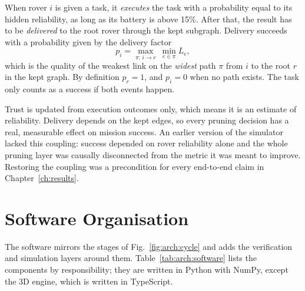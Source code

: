 \begin{definition}
When rover $i$ is given a task, it \emph{executes} the task with a
probability equal to its hidden reliability, as long as its battery is above
15\%. After that, the result has to be \emph{delivered} to the root rover
through the kept subgraph. Delivery succeeds with a probability given by the
delivery factor
\[
p_i=\max_{\pi:\,i\to r}\ \min_{e\in\pi} L_e,
\]
which is the quality of the weakest link on the \emph{widest} path $\pi$ from
$i$ to the root $r$ in the kept graph. By definition $p_r=1$, and $p_i=0$ when
no path exists. The task only counts as a success if both events happen.
\end{definition}

Trust is updated from execution outcomes only, which means it is an estimate
of reliability.
Delivery depends on the kept edges, so every pruning decision has a real,
measurable effect on mission success. An earlier version of the simulator
lacked this coupling: success depended on rover reliability alone and the
whole pruning layer was causally disconnected from the metric it was meant to
improve. Restoring the coupling was a precondition for every end-to-end claim
in Chapter~\ref{ch:results}.

\section{Software Organisation}

The software mirrors the stages of Fig.~\ref{fig:arch:cycle} and adds the
verification and simulation layers around them. Table~\ref{tab:arch:software}
lists the components by responsibility; they are written in Python with
NumPy, except the 3D engine, which is written in TypeScript.

